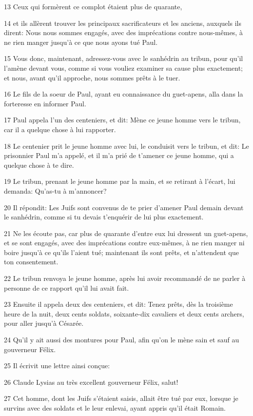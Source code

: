 \par 13 Ceux qui formèrent ce complot étaient plus de quarante,
\par 14 et ils allèrent trouver les principaux sacrificateurs et les anciens, auxquels ils dirent: Nous nous sommes engagés, avec des imprécations contre nous-mêmes, à ne rien manger jusqu'à ce que nous ayons tué Paul.
\par 15 Vous donc, maintenant, adressez-vous avec le sanhédrin au tribun, pour qu'il l'amène devant vous, comme si vous vouliez examiner sa cause plus exactement; et nous, avant qu'il approche, nous sommes prêts à le tuer.
\par 16 Le fils de la soeur de Paul, ayant eu connaissance du guet-apens, alla dans la forteresse en informer Paul.
\par 17 Paul appela l'un des centeniers, et dit: Mène ce jeune homme vers le tribun, car il a quelque chose à lui rapporter.
\par 18 Le centenier prit le jeune homme avec lui, le conduisit vers le tribun, et dit: Le prisonnier Paul m'a appelé, et il m'a prié de t'amener ce jeune homme, qui a quelque chose à te dire.
\par 19 Le tribun, prenant le jeune homme par la main, et se retirant à l'écart, lui demanda: Qu'as-tu à m'annoncer?
\par 20 Il répondit: Les Juifs sont convenus de te prier d'amener Paul demain devant le sanhédrin, comme si tu devais t'enquérir de lui plus exactement.
\par 21 Ne les écoute pas, car plus de quarante d'entre eux lui dressent un guet-apens, et se sont engagés, avec des imprécations contre eux-mêmes, à ne rien manger ni boire jusqu'à ce qu'ils l'aient tué; maintenant ils sont prêts, et n'attendent que ton consentement.
\par 22 Le tribun renvoya le jeune homme, après lui avoir recommandé de ne parler à personne de ce rapport qu'il lui avait fait.
\par 23 Ensuite il appela deux des centeniers, et dit: Tenez prêts, dès la troisième heure de la nuit, deux cents soldats, soixante-dix cavaliers et deux cents archers, pour aller jusqu'à Césarée.
\par 24 Qu'il y ait aussi des montures pour Paul, afin qu'on le mène sain et sauf au gouverneur Félix.
\par 25 Il écrivit une lettre ainsi conçue:
\par 26 Claude Lysias au très excellent gouverneur Félix, salut!
\par 27 Cet homme, dont les Juifs s'étaient saisis, allait être tué par eux, lorsque je survins avec des soldats et le leur enlevai, ayant appris qu'il était Romain.
